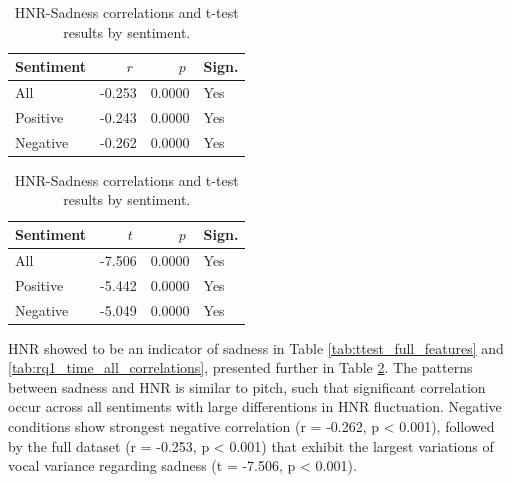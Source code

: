   \begin{table}[H]
    \centering
  
    \begin{subtable}{0.45\textwidth}
      \centering
      \caption{HNR and Sadness (r)}\label{tab:rq1_corr_hnr_sadness}
      \begin{tabular}{l r r l}
        \toprule
        Sentiment & \(\;r\;\) & \(\;p\;\) & Sign. \\
        \midrule
        All        & -0.253        & 0.0000    & Yes         \\
        Positive   & -0.243        & 0.0000    & Yes         \\
        Negative   & -0.262        & 0.0000    & Yes         \\
        \bottomrule
      \end{tabular}
    \end{subtable}\hfill
    \begin{subtable}{0.45\textwidth}
      \centering
      \caption{HNR and Sadness (t-test)}\label{tab:rq1_ttest_hnr_sadness}
      \begin{tabular}{l r r l}
        \toprule
        Sentiment & \(\;t\;\) & \(\;p\;\) & Sign. \\
        \midrule
        All        & -7.506       & 0.0000    & Yes         \\
        Positive   & -5.442       & 0.0000    & Yes         \\
        Negative   & -5.049       & 0.0000    & Yes         \\

        \bottomrule
      \end{tabular}
    \end{subtable}
  
    \caption{HNR-Sadness correlations and t-test results by sentiment.}
    \label{tab:rq1_hnr_sadness_side_by_side}
  \end{table}

HNR showed to be an indicator of sadness in Table \ref{tab:ttest_full_features} and \ref{tab:rq1_time_all_correlations}, presented further in Table \ref{tab:rq1_hnr_sadness_side_by_side}. The patterns between sadness and HNR is similar to pitch, such that significant correlation occur across all sentiments with large differentions in HNR fluctuation. 
Negative conditions show strongest negative correlation (r = -0.262, p < 0.001), followed by the full dataset (r = -0.253, p < 0.001) that exhibit the largest variations of vocal variance regarding sadness (t = -7.506, p < 0.001). 

